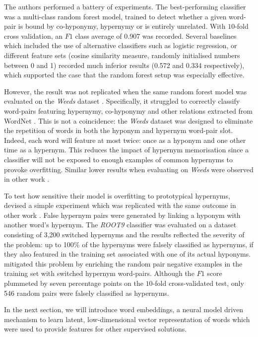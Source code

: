 The authors performed a  battery of experiments.  The best-performing classifier was a multi-class random forest model, trained to detect whether a given word-pair is bound by co-hyponymy, hypernymy or is entirely unrelated.  With $10$-fold cross validation, an $F1$ class average of 0.907 was recorded.  Several baselines which included the use of alternative classifiers such as logistic regression, or different feature sets (cosine similarity measure, randomly initialised numbers between 0 and 1) recorded much inferior results (0.572 and 0.334 respectively), which supported the case that the random forest setup was especially effective.  

However, the result was not replicated when the same random forest model was evaluated on the \textit{Weeds} dataset \citep{weeds2014learning}.  Specifically, it struggled to correctly classify word-pairs featuring hypernymy, co-hyponymy and other relations extracted from WordNet \citep{Miller1995}.  This is not a coincidence: the \textit{Weeds} dataset was designed to eliminate the repetition of words in both the hyponym and hypernym word-pair slot.  Indeed, each word will feature at most twice: once as a hyponym and one other time as a hypernym.  This reduces the impact of hypernym memorisation \citep{levy2015supervised} since a classifier will not be exposed to enough examples of common hypernyms to provoke overfitting.  Similar lower results when evaluating on \textit{Weeds} were observed in other work \citep{shwartz2017siege}.

To test how sensitive their model is overfitting to prototypical hypernyms, \citeauthor{santus2016nine} devised a simple experiment which was replicated with the same outcome in other work \citep{shwartz2017siege}.  False hypernym pairs were generated by linking a hyponym with another word’s hypernym.  The \textit{ROOT9} classifier was evaluated on a dataset consisting of 3,200 switched hypernyms and the results reflected the severity of the problem:  up to 100\% of the hypernyms were falsely classified as hypernyms, if they also featured in the training set associated with one of its actual hyponyms.  \citeauthor{santus2016nine} mitigated this problem by enriching the random pair negative examples in the training set with switched hypernym word-pairs.  Although the $F1$ score plummeted by seven percentage points on the $10$-fold cross-validated test, only 546 random pairs were falsely classified as hypernyms.

In the next section, we will introduce word embeddings, a neural model driven mechanism to learn latent, low-dimensional vector representation of words which were used to provide features for other supervised solutions.

